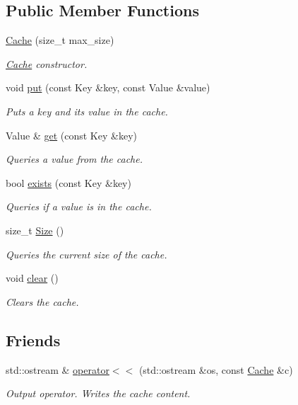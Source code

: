 \subsection*{Public Member Functions}
\begin{DoxyCompactItemize}
\item 
\hyperlink{classCache_aff01185fbb5b12ac5e139444e092b471}{Cache} (size\+\_\+t max\+\_\+size)
\begin{DoxyCompactList}\small\item\em \hyperlink{classCache}{Cache} constructor. \end{DoxyCompactList}\item 
void \hyperlink{classCache_a7b54629fb513d4b1652951bb713a0635}{put} (const Key \&key, const Value \&value)
\begin{DoxyCompactList}\small\item\em Puts a key and its value in the cache. \end{DoxyCompactList}\item 
Value \& \hyperlink{classCache_ae2c5a764bec9cf7bcc455d37377ff477}{get} (const Key \&key)
\begin{DoxyCompactList}\small\item\em Queries a value from the cache. \end{DoxyCompactList}\item 
bool \hyperlink{classCache_a3cbee30a98148ba6e15e28e4e096d995}{exists} (const Key \&key)
\begin{DoxyCompactList}\small\item\em Queries if a value is in the cache. \end{DoxyCompactList}\item 
size\+\_\+t \hyperlink{classCache_a6b13a48d9bc1217c9408e66543655e67}{Size} ()
\begin{DoxyCompactList}\small\item\em Queries the current size of the cache. \end{DoxyCompactList}\item 
\mbox{\label{classCache_addfc9aa7e42dcac6ab1ba103a75cdc66}} 
void \hyperlink{classCache_addfc9aa7e42dcac6ab1ba103a75cdc66}{clear} ()
\begin{DoxyCompactList}\small\item\em Clears the cache. \end{DoxyCompactList}\end{DoxyCompactItemize}
\subsection*{Friends}
\begin{DoxyCompactItemize}
\item 
std\+::ostream \& \hyperlink{classCache_a11049cc49065d8bad3f6154e155922f1}{operator$<$$<$} (std\+::ostream \&os, const \hyperlink{classCache}{Cache} \&c)
\begin{DoxyCompactList}\small\item\em Output operator. Writes the cache content. \end{DoxyCompactList}\end{DoxyCompactItemize}


